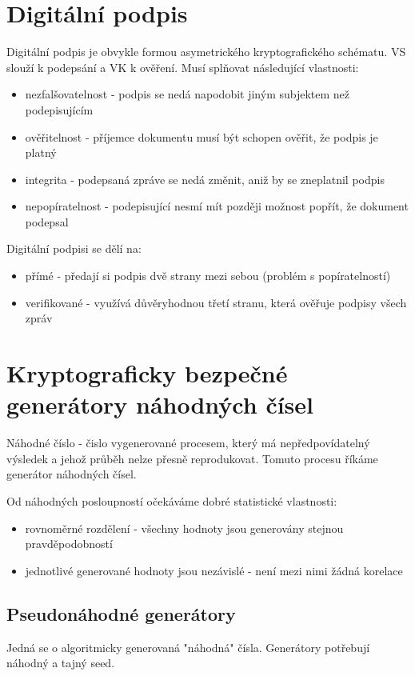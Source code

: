 \documentclass{szzclass}
\begin{document}
\section{Digitální podpis}
Digitální podpis je obvykle formou asymetrického kryptografického schématu. VS slouží k podepsání a VK k ověření.
\newline Musí splňovat následující vlastnosti:
\begin{itemize}
  \item nezfalšovatelnost - podpis se nedá napodobit jiným subjektem než podepisujícím
  \item ověřitelnost - příjemce dokumentu musí být schopen ověřit, že podpis je platný
  \item integrita - podepsaná zpráve se nedá změnit, aniž by se zneplatnil podpis
  \item nepopíratelnost - podepisující nesmí mít později možnost popřít, že dokument podepsal
\end{itemize}

Digitální podpisi se dělí na:
\begin{itemize}
  \item přímé - předají si podpis dvě strany mezi sebou (problém s popíratelností)
  \item verifikované - využívá důvěryhodnou třetí stranu, která ověřuje podpisy všech zpráv
\end{itemize}

\section{Kryptograficky bezpečné generátory náhodných čísel}
Náhodné číslo - čislo vygenerované procesem, který má nepředpovídatelný výsledek a jehož průběh
nelze přesně reprodukovat. Tomuto procesu říkáme generátor náhodných čísel.

Od náhodných posloupností očekáváme dobré statistické vlastnosti:
\begin{itemize}
  \item rovnoměrné rozdělení - všechny hodnoty jsou generovány stejnou pravděpodobností
  \item jednotlivé generované hodnoty jsou nezávislé - není mezi nimi žádná korelace
\end{itemize}

\subsection{Pseudonáhodné generátory}
Jedná se o algoritmicky generovaná "náhodná" čísla. Generátory potřebují náhodný a tajný seed.
\end{document}
